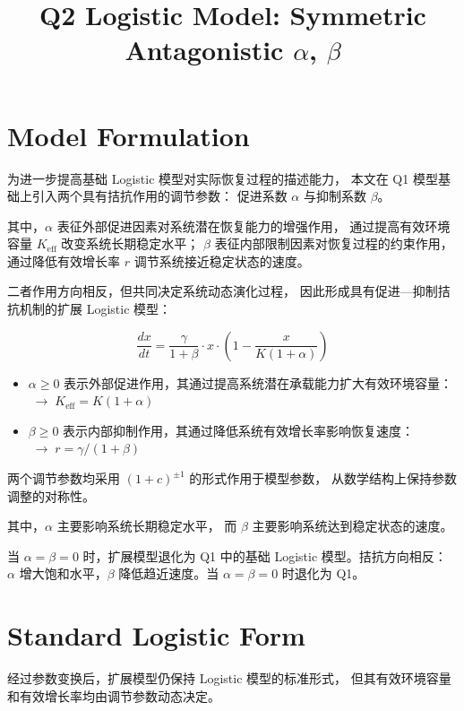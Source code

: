 \documentclass[12pt,a4paper]{article}
\title{Q2 Logistic Model: Symmetric Antagonistic $\alpha$, $\beta$}
\author{}
\date{}
\begin{document}
\maketitle

\section{Model Formulation}

为进一步提高基础 Logistic 模型对实际恢复过程的描述能力，
本文在 Q1 模型基础上引入两个具有拮抗作用的调节参数：
促进系数 $\alpha$ 与抑制系数 $\beta$。

其中，$\alpha$ 表征外部促进因素对系统潜在恢复能力的增强作用，
通过提高有效环境容量 $K_{\mathrm{eff}}$ 改变系统长期稳定水平；
$\beta$ 表征内部限制因素对恢复过程的约束作用，
通过降低有效增长率 $r$ 调节系统接近稳定状态的速度。

二者作用方向相反，但共同决定系统动态演化过程，
因此形成具有促进—抑制拮抗机制的扩展 Logistic 模型：

\begin{equation}\label{eq:ode}
\frac{dx}{dt} = \frac{\gamma}{1+\beta} \cdot x \cdot \left(1 - \frac{x}{K(1+\alpha)}\right)
\end{equation}

\begin{itemize}
  \item $\alpha\ge0$ 表示外部促进作用，其通过提高系统潜在承载能力扩大有效环境容量：  $\;\rightarrow\; K_{\text{eff}} = K(1+\alpha)$
  \item $\beta\ge0$ 表示内部抑制作用，其通过降低系统有效增长率影响恢复速度： $\;\rightarrow\; r = \gamma/(1+\beta)$
\end{itemize}

两个调节参数均采用 $(1+c)^{\pm1}$ 的形式作用于模型参数，
从数学结构上保持参数调整的对称性。

其中，$\alpha$ 主要影响系统长期稳定水平，
而 $\beta$ 主要影响系统达到稳定状态的速度。

当 $\alpha=\beta=0$ 时，扩展模型退化为 Q1 中的基础 Logistic 模型。拮抗方向相反：
$\alpha$ 增大饱和水平，$\beta$ 降低趋近速度。当 $\alpha = \beta = 0$ 时退化为 Q1。

\section{Standard Logistic Form}

经过参数变换后，扩展模型仍保持 Logistic 模型的标准形式，
但其有效环境容量和有效增长率均由调节参数动态决定。
\end{document}
